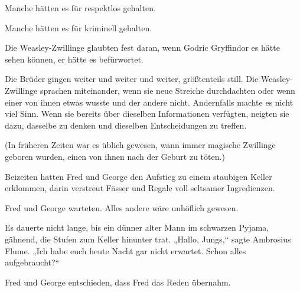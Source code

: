 Manche hätten es für respektlos gehalten.

Manche hätten es für kriminell gehalten.

Die Weasley-Zwillinge glaubten fest daran, wenn Godric Gryffindor es hätte sehen können, er hätte es befürwortet.

Die Brüder gingen weiter und weiter und weiter, größtenteils still. Die Weasley-Zwillinge sprachen miteinander, wenn sie neue Streiche durchdachten oder wenn einer von ihnen etwas wusste und der andere nicht. Andernfalls machte es nicht viel Sinn. Wenn sie bereits über dieselben Informationen verfügten, neigten sie dazu, dasselbe zu denken und dieselben Entscheidungen zu treffen.

(In früheren Zeiten war es üblich gewesen, wann immer magische Zwillinge geboren wurden, einen von ihnen nach der Geburt zu töten.)

Beizeiten hatten Fred und George den Aufstieg zu einem staubigen Keller erklommen, darin verstreut Fässer und Regale voll seltsamer Ingredienzen.

Fred und George warteten. Alles andere wäre unhöflich gewesen.

Es dauerte nicht lange, bis ein dünner alter Mann im schwarzen Pyjama, gähnend, die Stufen zum Keller hinunter trat. „Hallo, Jungs,“ sagte Ambrosius Flume. „Ich habe euch heute Nacht gar nicht erwartet. Schon alles aufgebraucht?“

Fred und George entschieden, dass Fred das Reden übernahm.

